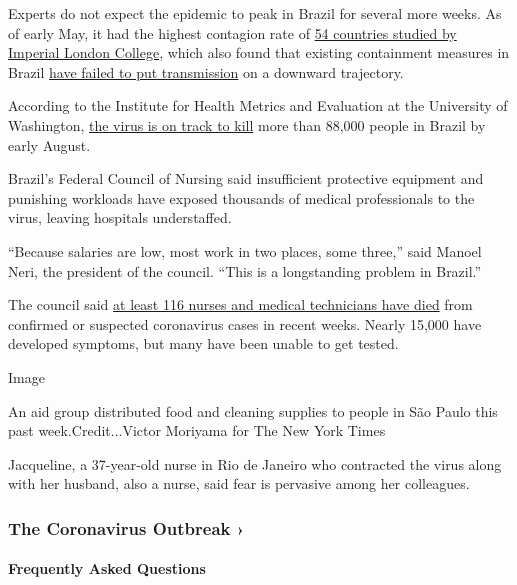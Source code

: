 Experts do not expect the epidemic to peak in Brazil for several more
weeks. As of early May, it had the highest contagion rate of
\href{https://mrc-ide.github.io/covid19-short-term-forecasts/index.html}{54
countries studied by Imperial London College}, which also found that
existing containment measures in Brazil
\href{https://www.imperial.ac.uk/news/197474/coronavirus-under-control-brazil-scientists-warn/}{have
failed to put transmission} on a downward trajectory.

According to the Institute for Health Metrics and Evaluation at the
University of Washington, \href{http://www.healthdata.org/brazil}{the
virus is on track to kill} more than 88,000 people in Brazil by early
August.

Brazil's Federal Council of Nursing said insufficient protective
equipment and punishing workloads have exposed thousands of medical
professionals to the virus, leaving hospitals understaffed.

``Because salaries are low, most work in two places, some three,'' said
Manoel Neri, the president of the council. ``This is a longstanding
problem in Brazil.''

The council said \href{http://observatoriodaenfermagem.cofen.gov.br}{at
least 116 nurses and medical technicians have died} from confirmed or
suspected coronavirus cases in recent weeks. Nearly 15,000 have
developed symptoms, but many have been unable to get tested.

Image

An aid group distributed food and cleaning supplies to people in São
Paulo this past week.Credit...Victor Moriyama for The New York Times

Jacqueline, a 37-year-old nurse in Rio de Janeiro who contracted the
virus along with her husband, also a nurse, said fear is pervasive among
her colleagues.

\href{https://www.nytimes3xbfgragh.onion/news-event/coronavirus?action=click\&pgtype=Article\&state=default\&region=MAIN_CONTENT_3\&context=storylines_faq}{}

\hypertarget{the-coronavirus-outbreak-}{%
\subsubsection{The Coronavirus Outbreak
›}\label{the-coronavirus-outbreak-}}

\hypertarget{frequently-asked-questions}{%
\paragraph{Frequently Asked
Questions}\label{frequently-asked-questions}}

